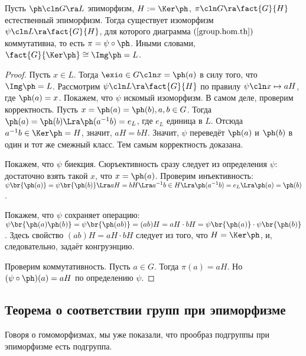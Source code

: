 \documentclass[a4paper]{article}
\newcommand{\kph}{\Ker \ph}
\begin{document}
\begin{theorem}
Пусть $\ph\cln G \ra L$ эпиморфизм, $H := \kph$, $\pi\cln G \ra \fact{G}{H}$  естественный эпиморфизм.
Тогда существует изоморфизм $\psi\cln L \ra \fact{G}{H}$, для которого диаграмма $(\ref{group.hom.th})$
коммутативна, то есть $\pi = \psi \circ \ph$. 
Иными словами, $\fact{G}{\kph} \cong \Img \ph =L$.
\end{theorem}
\begin{proof}
Пусть $x \in L$. Тогда $\exi a \in G\cln x=\ph(a)$ в силу того, что $\Img \ph = L$.  Рассмотрим
$\psi\cln L \ra \fact{G}{H}$ по правилу $\psi\cln x \mapsto aH$, где $\ph(a)=x$. Покажем, что $\psi$ искомый изоморфизм. В
самом деле, проверим корректность. Пусть $x=\ph(a)=\ph(b), a,b \in G$. Тогда $\ph(a)=\ph(b) \Lra
\ph(a^{-1}b)=e_L$, где $e_L$ единица в $L$. Отсюда $a^{-1}b \in \kph = H$, значит, $aH=bH$. Значит, $\psi$
переведёт $\ph(a)$ и $\ph(b)$ в один и тот же смежный класс. Тем самым корректность доказана.

Покажем, что $\psi$ биекция. Сюръективность сразу следует из определения  $\psi$: достаточно взять такой
$x$, что $x=\ph(a)$. Проверим инъективность: $\psi\br{\ph(a)} =\psi\br{\ph(b)} \Lra aH=bH \Lra a^{-1}b \in H
\Lra \ph(a^{-1}b) = e_L \Lra \ph(a)=\ph(b)$.

Покажем, что $\psi$ сохраняет операцию: $\psi\br{\ph(a)\ph(b)}=\psi\br{\ph(ab)}=(ab)H=aH \cdot
bH=\psi\br{\ph(a)}\cdot\psi\br{\ph(b)}$. Здесь свойство $(ab)H =aH \cdot bH$ следует из того, что $H =\kph$,
и, следовательно, задаёт конгруэнцию.

Проверим коммутативность. Пусть $a \in G$. Тогда $\pi(a)=aH$. Но $(\psi \circ \ph)(a)=aH$ по определению
$\psi$.
\end{proof}

\subsection{Теорема о соответствии групп при эпиморфизме}

Говоря о гомоморфизмах, мы уже показали, что прообраз подгруппы при эпиморфизме есть подгруппа.
\end{document}
